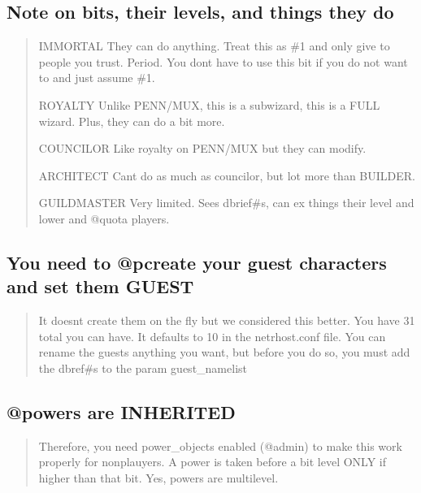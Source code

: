\documentclass[letterpaper,10pt,english]{sphinxmanual}
\begin{document}
\subsection{Note on bits, their levels, and things they do}
\label{\detokenize{features:note-on-bits-their-levels-and-things-they-do}}\begin{quote}

\sphinxAtStartPar
IMMORTAL \sphinxhyphen{} They can do anything.  Treat this as \#1 and only give to
people you trust.  Period.   You don\textquotesingle{}t have to use this bit
if you do not want to and just assume \#1.

\sphinxAtStartPar
ROYALTY \sphinxhyphen{} Unlike PENN/MUX, this is  a sub\sphinxhyphen{}wizard, this is a
FULL wizard.  Plus, they can do a bit more.

\sphinxAtStartPar
COUNCILOR \sphinxhyphen{} Like royalty on PENN/MUX but they can modify.

\sphinxAtStartPar
ARCHITECT \sphinxhyphen{} Can\textquotesingle{}t do as much as councilor, but lot more than BUILDER.

\sphinxAtStartPar
GUILDMASTER \sphinxhyphen{} Very limited.  Sees dbrief\#\textquotesingle{}s, can ex things their
level and lower and @quota players.
\end{quote}


\subsection{You need to @pcreate your guest characters and set them GUEST}
\label{\detokenize{features:you-need-to-pcreate-your-guest-characters-and-set-them-guest}}\begin{quote}

\sphinxAtStartPar
It doesn\textquotesingle{}t create them on the fly but we considered this better.
You have 31 total you can have.  It defaults to 10 in the
netrhost.conf file.  You can rename the guests anything you want,
but before you do so, you must add the dbref\#\textquotesingle{}s to the param
guest\_namelist
\end{quote}


\subsection{@powers are INHERITED}
\label{\detokenize{features:powers-are-inherited}}\begin{quote}

\sphinxAtStartPar
Therefore, you need power\_objects enabled (@admin)
to make this work properly for non\sphinxhyphen{}plauyers.
A power is taken before a bit level ONLY if higher than that bit.
Yes, powers are multi\sphinxhyphen{}level.
\end{quote}
\end{document}
